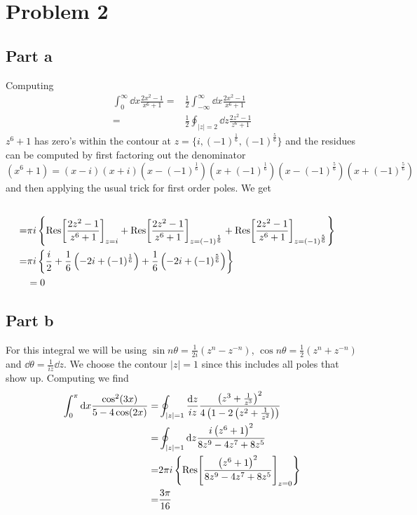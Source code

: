 \documentclass[a4paper,12pt]{article}
\begin{document}
\section*{Problem 2}
\subsection*{Part a}
Computing
\begin{equation}
	\begin{aligned}
		\int_{0}^{\infty}\dd x\frac{2x^2-1}{x^6+1}
		=&	\frac{1}{2}\int_{-\infty}^{\infty}\dd x\frac{2x^2-1}{x^6+1}
		\\
		=&\frac{1}{2}\oint_{|z|=2} \dd z\frac{2z^2-1}{z^6+1}
	\end{aligned}
\end{equation}
$z^6+1$ has zero's within the contour at $z=\{i,(-1)^{\frac{1}{6}},(-1)^{\frac{5}{6}}\}$ and the residues can be computed by first factoring out the denominator 
\begin{equation}
(x^6+1)=(x-i)(x+i)\left(x-(-1)^{\frac{1}{6}}\right)\left(x+(-1)^{\frac{1}{6}}\right)\left(x-(-1)^{\frac{5}{6}}\right)\left(x+(-1)^{\frac{5}{6}}\right)
\end{equation}
and then applying the usual trick for first order poles. We get
\begin{equation}
\begin{aligned}
		\\
		=&\pi i
		 \left\{\Res[\frac{2z^2-1}{z^6+1}]_{z=i}+\Res[\frac{2z^2-1}{z^6+1}]_{z=(-1)^{\frac{1}{6}}}+\Res[\frac{2z^2-1}{z^6+1}]_{z=(-1)^{\frac{5}{6}}}\right\}\\
		=&\pi i \left\{\frac{i}{2}+\frac{1}{6}\left(-2i+(-1)^{\frac{1}{6}}\right)+\frac{1}{6}\left(-2i+(-1)^{\frac{5}{6}}\right)\right\}\\
		&=0
	\end{aligned}
\end{equation}

\subsection*{Part b}
For this integral we will be using $\sin n\theta =\frac{1}{2i}\left(z^n-z^{-n}\right)$, $\cos n\theta =\frac{1}{2}\left(z^n+z^{-n}\right)$ and $\dd \theta=\frac{1}{iz}\dd z$. We choose the contour $|z|=1$ since this includes all poles that show up. Computing we find
\begin{equation}
	\begin{aligned}
		\int_{0}^{\pi}\dd x\frac{\cos^2(3x)}{5-4\cos(2x)}
		=&\oint_{|z|=1}\frac{\dd z}{iz}\frac{\left(z^3+\frac{1}{z^3}\right)^2}{4 \left(1-2 \left(z^2+\frac{1}{z^2}\right)\right)}\\
		=&\oint_{|z|=1}\dd z \frac{i \left(z^6+1\right)^2}{8 z^9-4 z^7+8 z^5}\\
			=&2\pi i \left\{
			\Res[\frac{\left(z^6+1\right)^2}{8 z^9-4 z^7+8 z^5}]_{z=0}
			\right\}\\
			=&\frac{3\pi}{16}
	\end{aligned}
\end{equation}
\end{document}

